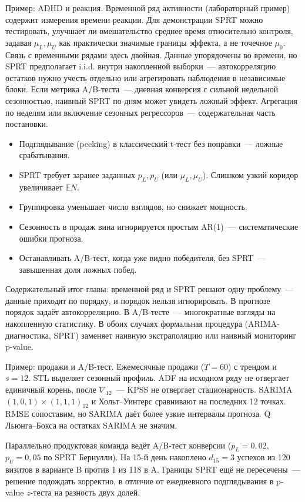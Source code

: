 Пример: ADHD и реакция. Временной ряд активности (лабораторный пример) содержит измерения времени реакции. Для демонстрации SPRT можно тестировать, улучшает ли вмешательство среднее время относительно контроля, задавая $\mu_L,\mu_U$ как практически значимые границы эффекта, а не точечное $\mu_0$.
Связь с временными рядами здесь двойная. Данные упорядочены во времени, но SPRT предполагает i.i.d. внутри накопленной выборки~--- автокорреляцию остатков нужно учесть отдельно или агрегировать наблюдения в независимые блоки.
Если метрика A/B-теста~--- дневная конверсия с сильной недельной сезонностью, наивный SPRT по дням может увидеть ложный эффект. Агрегация по неделям или включение сезонных регрессоров~--- содержательная часть постановки.

\begin{itemize}
    \item Подглядывание (peeking) в классический t-тест без поправки~---
          ложные срабатывания.
    \item SPRT требует заранее заданных $p_L,p_U$ (или $\mu_L,\mu_U$). Слишком узкий
          коридор увеличивает $\mathbb{E}N$.
    \item Группировка уменьшает число взглядов, но снижает мощность.
    \item Сезонность в продаж вина игнорируется простым AR(1)~---
          систематические ошибки прогноза.
    \item Останавливать A/B-тест, когда уже видно победителя, без SPRT~---
          завышенная доля ложных побед.
\end{itemize}
Содержательный итог главы: временной ряд и SPRT решают одну проблему~--- данные приходят по порядку, и порядок нельзя игнорировать.
В прогнозе порядок задаёт автокорреляцию. В A/B-тесте~--- многократные взгляды на накопленную статистику. В обоих случаях формальная процедура (ARIMA-диагностика, SPRT) заменяет наивную экстраполяцию или наивный мониторинг p-value.

Пример: продажи и A/B-тест. Ежемесячные продажи ($T=60$) с трендом и $s=12$. STL выделяет сезонный профиль. ADF на исходном ряду не отвергает единичный корень, после $\nabla_{12}$~--- KPSS не отвергает стационарность. SARIMA$(1,0,1)\times(1,1,1)_{12}$ и Хольт--Уинтерс сравнивают на последних 12 точках. RMSE сопоставим, но SARIMA даёт более узкие интервалы прогноза. Q Льюнга--Бокса на остатках SARIMA не значим.

Параллельно продуктовая команда ведёт A/B-тест конверсии ($p_L=0{,}02$, $p_U=0{,}05$ по SPRT Бернулли). На 15-й день накоплено $d_{15}=3$ успехов из 120 визитов в варианте B против 1 из 118 в A. Границы SPRT ещё не пересечены~--- решение подождать корректно, в отличие от ежедневного подглядывания в p-value $z$-теста на разность двух долей.

